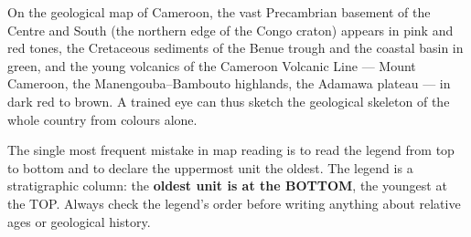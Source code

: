 \documentclass[11pt]{article}
\begin{document}
\begin{savaistu}
On the geological map of Cameroon, the vast Precambrian basement of the Centre and South (the northern edge of the Congo craton) appears in pink and red tones, the Cretaceous sediments of the Benue trough and the coastal basin in green, and the young volcanics of the Cameroon Volcanic Line — Mount Cameroon, the Manengouba–Bambouto highlands, the Adamawa plateau — in dark red to brown. A trained eye can thus sketch the geological skeleton of the whole country from colours alone.
\end{savaistu}

\begin{attention}
The single most frequent mistake in map reading is to read the legend from top to bottom and to declare the uppermost unit the oldest. The legend is a stratigraphic column: the \textbf{oldest unit is at the BOTTOM}, the youngest at the TOP. Always check the legend's order before writing anything about relative ages or geological history.
\end{attention}
\end{document}
